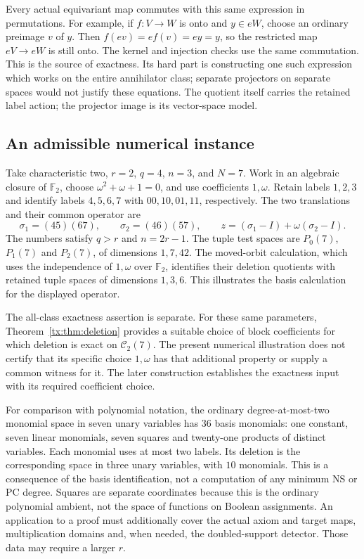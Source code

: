 \documentclass[11pt,a4paper,oneside,openany]{book}
\theoremstyle{definition}\newtheorem{definition}[theorem]{Definition}
\theoremstyle{remark}\newtheorem{remark}[theorem]{Remark}
\numberwithin{equation}{chapter}
\begin{document}
Every actual equivariant map commutes with this same expression
in permutations. For example, if $f:V\to W$ is onto and
$y\in eW$, choose an ordinary preimage $v$ of $y$. Then
$f(ev)=e f(v)=ey=y$, so the restricted map $eV\to eW$
is still onto. The kernel and injection checks use the same
commutation. This is the source of exactness. Its hard part is
constructing one such expression which works on the entire
annihilator class; separate projectors on separate spaces would
not justify these equations. The quotient itself carries the
retained label action; the projector image is its vector-space
model.

\subsection*{An admissible numerical instance}
Take characteristic two, $r=2$, $q=4$, $n=3$, and $N=7$.
Work in an algebraic closure of $\mathbb F_2$, choose
$\omega^2+\omega+1=0$, and use coefficients $1,\omega$.
Retain labels $1,2,3$ and identify labels $4,5,6,7$ with
$00,10,01,11$, respectively. The two translations and their
common operator are
\[
 \sigma_1=(45)(67),\qquad\sigma_2=(46)(57),\qquad
 z=(\sigma_1-I)+\omega(\sigma_2-I).
\]
The numbers satisfy $q>r$ and $n=2r-1$.
The tuple test spaces are $P_0(7)$, $P_1(7)$ and $P_2(7)$,
of dimensions $1,7,42$. The moved-orbit calculation, which uses
the independence of $1,\omega$ over $\mathbb F_2$, identifies
their deletion quotients with retained tuple spaces of dimensions
$1,3,6$. This illustrates the basis calculation for the displayed
operator.

The all-class exactness assertion is separate. For these same
parameters, Theorem~\ref{tx:thm:deletion} provides a suitable choice
of block coefficients for which deletion is exact on
$\mathcal C_2(7)$. The present numerical illustration does not
certify that its specific choice $1,\omega$ has that additional
property or supply a common witness for it. The later construction
establishes the exactness input with its required coefficient choice.

For comparison with polynomial notation, the ordinary degree-at-most-two
monomial space in seven unary variables has $36$ basis monomials:
one constant, seven linear monomials, seven squares and twenty-one
products of distinct variables. Each monomial uses at most two
labels. Its deletion is the corresponding space in three unary
variables, with $10$ monomials. This is a consequence of the basis
identification, not a computation of any minimum NS or PC degree.
Squares are separate coordinates because this is the ordinary
polynomial ambient, not the space of functions on Boolean assignments.
An application to a proof must additionally cover the actual axiom
and target maps, multiplication domains and, when needed, the
doubled-support detector. Those data may require a larger $r$.
\end{document}
